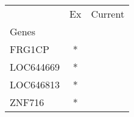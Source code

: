 \begin{tabular}{lcc}
\toprule
{} & Ex & Current \\
Genes     &    &         \\
\midrule
FRG1CP    &  * &         \\
LOC644669 &  * &         \\
LOC646813 &  * &         \\
ZNF716    &  * &         \\
\bottomrule
\end{tabular}
